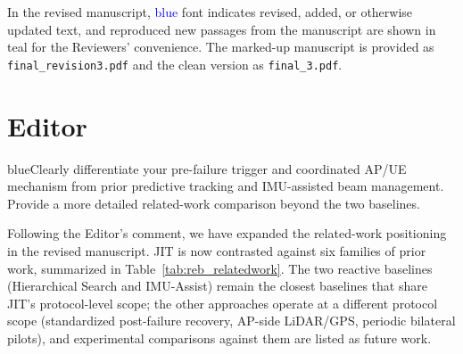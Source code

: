 \documentclass{article}
\newcommand{\blue}[1]{\begin{color}{blue}#1\end{color}}
\begin{document}
\noindent In the revised manuscript, \textcolor{blue}{blue} font indicates revised, added, or otherwise updated text, and reproduced new passages from the manuscript are shown in \textcolor{cyan!75!black}{teal} for the Reviewers' convenience. The marked-up manuscript is provided as \texttt{final\_revision3.pdf} and the clean version as \texttt{final\_3.pdf}.\\

\newpage

\section*{Editor}

\begin{tcbremark}
{\selectfont
\blue{Clearly differentiate your pre-failure trigger and coordinated AP/UE mechanism from prior predictive tracking and IMU-assisted beam management. Provide a more detailed related-work comparison beyond the two baselines.}
}
\end{tcbremark}

\noindent Following the Editor's comment, we have expanded the related-work positioning in the revised manuscript. JIT is now contrasted against six families of prior work, summarized in Table~\ref{tab:reb_relatedwork}. The two reactive baselines (Hierarchical Search and IMU-Assist) remain the closest baselines that share JIT's protocol-level scope; the other approaches operate at a different protocol scope (standardized post-failure recovery, AP-side LiDAR/GPS, periodic bilateral pilots), and experimental comparisons against them are listed as future work.\\
\end{document}
